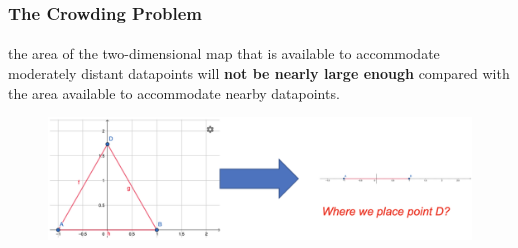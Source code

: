 \documentclass{beamer}
\begin{document}
% 
% 
% 
% 
% 
% 
\begin{frame}
  \frametitle{The Crowding Problem}
  \framesubtitle{}

the area of the two-dimensional map that is available to accommodate moderately distant datapoints will \textbf{not be nearly large enough} compared with the area available to accommodate nearby datapoints.

    \begin{figure}
        \centering
        \includegraphics[height=0.3\textheight]{images/figure1.png}
    \end{figure}

\end{frame}
\end{document}
